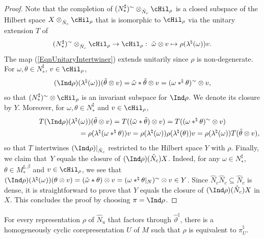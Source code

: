 \begin{proof}
 Note that the completion of $  (N_\ast^{\sharp})^{\sim}   \otimes_{\hat{N}_c}  \cHil_\rho$ is a closed subspace of the Hilbert space $X  \otimes_{\hat{N}_c} \cHil_\rho$ that is isomorphic to $\cHil_\rho$ via the unitary  extension $T$ of
\begin{gather}\label{EqnUnitaryIntertwiner}
( N_\ast^\sharp) ^\sim  \otimes_{\hat{N}_c} \cHil_\rho \rightarrow \cHil_\rho: \ \tilde{\omega} \otimes v \mapsto \rho(\lambda ^\natural(\omega)) v.
\end{gather}
The map (\ref{EqnUnitaryIntertwiner}) extends unitarily since $\rho$ is non-degenerate. For $\omega, \theta \in N_\ast^\sharp$, $v \in \cHil_\rho$,
\[
(\Ind \rho)(\lambda^\natural(\omega))  (\tilde{\theta} \otimes v) = \tilde{\omega} \ast \tilde{\theta} \otimes v = (\omega \ast^\natural \theta)^\sim \otimes v,
\]
 so that $(N_\ast^\sharp)^\sim  \otimes \cHil_\rho$ is an invariant subspace for $ \Ind \rho $. We denote its closure by $Y$. Moreover, for $\omega, \theta \in N_\ast^\sharp$ and $v \in \cHil_\rho$,
\begin{gather*}
  T    (\Ind \rho)  (\lambda^\natural(\omega))   ( \tilde{\theta} \otimes v )  =
T ((\tilde{\omega} \ast \tilde{\theta})  \otimes v)  = T ((\omega \ast^\natural \theta)^\sim \otimes v)  \\
\phantom{T    (\Ind \rho)  (\lambda^\natural(\omega))   ( \tilde{\theta} \otimes v ) }{}
=   \rho(\lambda^\natural(\omega \ast^\natural \theta)) v  =   \rho(\lambda^\natural(\omega)) \rho(\lambda^\natural( \theta)) v =
  \rho(\lambda^\natural(\omega)) T  ( \tilde{\theta} \otimes v ),
\end{gather*}
so that $T$ intertwines  $ (\Ind \rho)\vert_{\hat{N}_c}  $ restricted to the Hilbert space   $Y$ with $\rho$. Finally, we claim that~$Y$ equals the closure of $(\Ind\rho)(\hat{N}_c) X$. Indeed, for any $\omega \in N_\ast^\sharp$, $\theta \in M_\ast^{\sharp, \beta}$ and $v \in \cHil_\rho$, we see that $(\Ind\rho)(\lambda^\natural(\omega)) ( \theta \otimes v) = (\tilde{\omega} \ast \theta) \otimes v = (\omega \ast^\natural \theta\vert_N)^\sim \otimes v \in Y$. Since $\hat{N}_c \hat{N}_c \subseteq \hat{N}_c$ is dense, it is straightforward to prove that  $Y$ equals the closure of $(\Ind\rho)(\hat{N}_c) X$ in $X$. This concludes the proof by choosing $\pi = \Ind \rho$.
\end{proof}

\begin{cor}\label{CorRep}
For every representation $\rho$ of $\hat{N}_u$ that factors through $\hat{\vartheta}^\natural$, there is a homogeneously cyclic corepresentation $U$ of $M$ such that $\rho$ is equivalent to $\pi_U^\natural$.
\end{cor}


